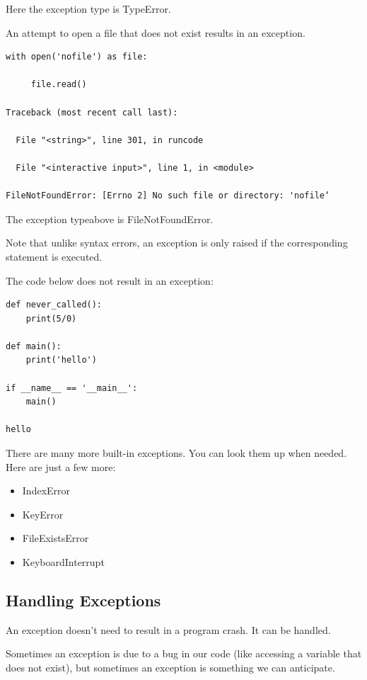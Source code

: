 \documentclass{article}
\begin{document}
Here the exception type is TypeError.

An attempt to open a file that does not exist results in an exception.

\begin{lstlisting}
with open('nofile') as file:

     file.read()     

Traceback (most recent call last):

  File "<string>", line 301, in runcode

  File "<interactive input>", line 1, in <module>

FileNotFoundError: [Errno 2] No such file or directory: 'nofile‘
\end{lstlisting}

The exception typeabove is FileNotFoundError.

Note that unlike syntax errors, an exception is only raised if the corresponding statement is executed.

The code below does not result in an exception:

\begin{lstlisting}
def never_called():
    print(5/0)
 
def main():
    print('hello')
 
if __name__ == '__main__':
    main()
 
hello
\end{lstlisting}

There are many more built-in exceptions.  You can look them up when needed.  Here are just a few more:

\begin{itemize}
\item IndexError

\item KeyError

\item FileExistsError

\item KeyboardInterrupt
\end{itemize}

\subsection{Handling Exceptions}

An exception doesn’t need to result in a program crash.  It can be handled. 

Sometimes an exception is due to a bug in our code (like accessing a variable that does not exist), but sometimes an exception is something we can anticipate. 
\end{document}
